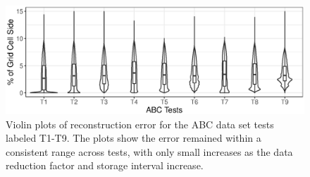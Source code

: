 \begin{figure}[!t]
\centering
\includegraphics[width=\linewidth]{Images/ABC_Tests.eps}
\caption{Violin plots of reconstruction error for the ABC data set tests labeled T1-T9. The plots show the error remained within a consistent range across tests, with only small increases as the data reduction factor and storage interval increase.}
\vspace{-5mm}
\label{fig:abc_plot}
\end{figure}
